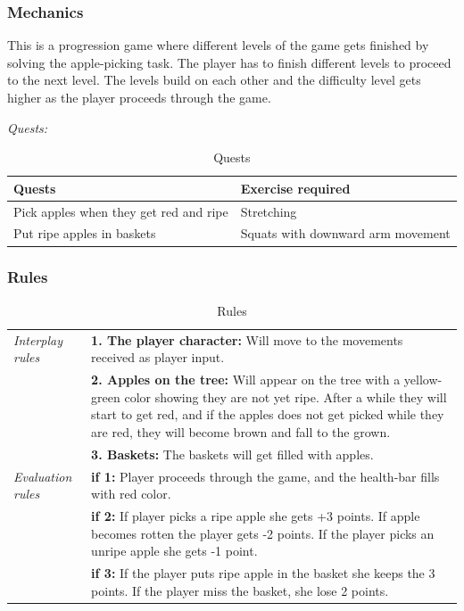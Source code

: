 \subsubsection{Mechanics} 
This is a progression game where different levels of the game gets finished by solving the apple-picking task. The player has to finish different levels to proceed to the next level. The levels build on each other and the difficulty level gets higher as the player proceeds through the game.

\emph{Quests:} 

\begin{table}
\begin{tabular}{|>{\raggedright}p{}|p{}|}
\hline
\textbf{Quests} & \textbf{Exercise required}  \\ \hline
Pick apples when they get red and ripe & Stretching  \\ \hline
Put ripe apples in baskets &  Squats with downward arm movement \\ \hline
\end{tabular}
\caption[Quests in the "Apple Picking" game]{Quests}
\label{tab:quests2}
\end{table}

\subsubsection{Rules} 

\begin{table} [H]
\centering
\begin{tabular}{|p{}|p{}|}
\hline
\emph{Interplay rules} & \textbf{1. The player character:} Will move to the movements received as player input. \\ \cline{2-2}
 &  \textbf{2. Apples on the tree:} Will appear on the tree with a yellow-green color showing they are not yet ripe. After a while they will start to get red, and if the apples does not get picked while they are red, they will become brown and fall to the grown. \\ \cline{2-2}
& \textbf{3. Baskets:} The baskets will get filled with apples. \\ \hline
\emph{Evaluation rules} & \textbf{if 1:} Player proceeds through the game, and the health-bar fills with red color.\\ \cline{2-2}
 & \textbf{if 2:} If player picks a ripe apple she gets +3 points. If apple becomes rotten the player gets -2 points. If the player picks an unripe apple she gets -1 point. \\ \cline{2-2}
& \textbf{if 3:} If the player puts ripe apple in the basket she keeps the 3 points. If the player miss the basket, she lose 2 points.  \\ \hline
\end{tabular}
\caption[Rules for the "Apple Picking" game]{Rules}
\label{tab:rules2}
\end{table}  

